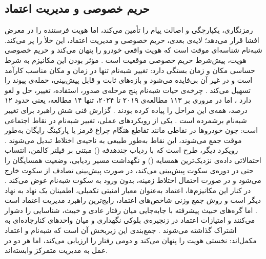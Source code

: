 \subsection{حریم خصوصی و مدیریت اعتماد}

رمزنگاری، یکپارچگی و اصالت پیام را تأمین می‌کند، اما هویت فرستنده را در معرض افشا قرار می‌دهد؛ لایه‌ی بعدی، حریم خصوصی و مدیریت اعتماد، این خلأ را پر می‌کند. شبه‌نام شناسه‌ای موقت است که هویت واقعی خودرو را پنهان می‌کند \cite{rahmawatiagustinaSystematicLiteratureReview2025} و حریم خصوصی هویت، پیش‌شرط حریم خصوصی موقعیت است \cite{luPseudonymChangingSocial2012}. مؤثر بودن این مکانیزم به شرط حساسی مکان و زمان بستگی دارد: تغییر شبه‌نام تنها در زمان و مکان مناسب کارآمد است و در غیر آن بی‌فایده می‌شود \cite{luPseudonymChangingSocial2012} و بازه‌های ثابت و قابل پیش‌بینی، حمله‌ی پیوند را تسهیل می‌کند \cite{rahmawatiagustinaSystematicLiteratureReview2025}. چرخه‌ی حیات شبه‌نام پنج مرحله‌ی صدور، استفاده، تغییر، حل و لغو دارد \cite{rahmawatiagustinaSystematicLiteratureReview2025}، اما در مروری بر ۱۱۳ مطالعه‌ی ۲۰۱۹ تا ۲۰۲۴، تنها ۱۴ مطالعه، یعنی حدود ۱۲ درصد، همه‌ی این مراحل را پیاده کرده بودند \cite{rahmawatiagustinaSystematicLiteratureReview2025}. گزارش فنی  شش راهبرد برای تغییر شبه‌نام برشمرده است \cite{rahmawatiagustinaSystematicLiteratureReview2025}. یکی از رویکردهای عملی، تغییر شبه‌نام در نقاط اجتماعی است: چون خودروها در نقاطی مانند تقاطع هنگام چراغ قرمز یا پارکینگ رایگان به‌طور موقت جمع می‌شوند، این نقاط به‌طور طبیعی به ناحیه‌ی اختلاط تبدیل می‌شوند \cite{luPseudonymChangingSocial2012}. رویکرد دیگر، طرح  است که با ردیاب چندهدفه () مبتنی بر فیلتر کالمن، انتساب احتمالاتی داده‌ی نزدیک‌ترین همسایه () و نگهداشت مسیر ردیابی، وضعیت همسایگان را حتی در دوره‌ی سکوت پیش‌بینی می‌کند، در صورت پیش‌بینی تصادف از سکوت خارج می‌شود و در صورت احتمال اختلاط زمینه، بدون ورود به سکوت شبه‌نام عوض می‌کند \cite{al-aniPrivacySafetyImprovement2023}. در کنار این مکانیزم‌ها، اعتماد به‌عنوان معیار امنیتی تکمیلی، اطمینان یک نهاد به نهاد دیگر است \cite{farsimadanReviewSecurityChallenges2025} و روش جمع وزنی شاخص‌های اعتماد، رایج‌ترین راهبرد مدیریت اعتماد است \cite{farsimadanReviewSecurityChallenges2025}. اما گره‌های خبیث پیشرفته با جابه‌جایی میان رفتار عادی و خبیث، شناسایی را دشوار می‌کنند \cite{farsimadanReviewSecurityChallenges2025} و امتیازات اعتماد در زنجیره‌ی بلوکی نگهداری و میان واحدهای کنارجاده‌ای به اشتراک گذاشته می‌شوند \cite{razaBlockchainBasedReputationTrust2024}. جمع‌بندی این زیربخش آن است که شبه‌نام و اعتماد مکمل‌اند: نخستی هویت را پنهان می‌کند و دومی رفتار را ارزیابی می‌کند، اما هر دو در عمل به مدیریت متمرکز وابسته‌اند.

